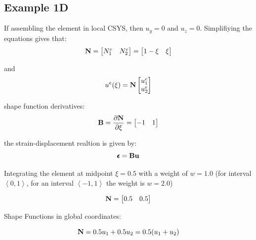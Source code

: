 \subsection{Example 1D}
If assembling the element in local CSYS, then $ u_y = 0 $ and $ u_z = 0 $.
Simplifiying the equations gives that:
\begin{equation}
    \mathbf{N} = \begin{bmatrix}
        N_1^e & N_2^e \\
    \end{bmatrix}
    = \begin{bmatrix}
        1 - \xi & \xi \\
    \end{bmatrix}
\end{equation}

and
\begin{equation}
    u^e(\xi) = \mathbf{N} \begin{bmatrix}
        u_1^e \\
        u_2^e \\
    \end{bmatrix}
\end{equation}

shape function derivatives:
\begin{equation}
    \mathbf{B} = \frac{\partial \mathbf{N}}{\partial \xi} =
    \begin{bmatrix}
        -1 & 1 \\
    \end{bmatrix}
\end{equation}

the strain-displacement realtion is given by:
\begin{equation}
    \pmb{\epsilon} = \mathbf{B} \mathbf{u}
\end{equation}

Integrating the element at midpoint $ \xi = 0.5 $ with a weight of $ w = 1.0 $
(for interval $ \left< 0, 1 \right> $, for an interval
$ \left< -1,  1 \right> $ the weight is $ w = 2.0 $)

\begin{equation}
    \mathbf{N} = \begin{bmatrix}
        0.5 & 0.5 \\
    \end{bmatrix}
\end{equation}

Shape Functions in global coordinates:

\begin{equation}
    \mathbf{N} = 0.5 u_1 + 0.5 u_2 = 0.5 (u_1 + u_2)
\end{equation}

